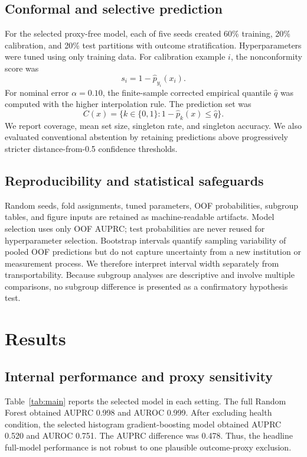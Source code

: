 \documentclass[conference]{IEEEtran}
\begin{document}
\subsection{Conformal and selective prediction}
For the selected proxy-free model, each of five seeds created 60\% training, 20\% calibration, and 20\% test partitions with outcome stratification. Hyperparameters were tuned using only training data. For calibration example $i$, the nonconformity score was
\begin{equation}
s_i = 1 - \hat{p}_{y_i}(x_i).
\end{equation}
For nominal error $\alpha=0.10$, the finite-sample corrected empirical quantile $\hat{q}$ was computed with the higher interpolation rule. The prediction set was
\begin{equation}
C(x)=\{k \in \{0,1\}: 1-\hat{p}_k(x) \leq \hat{q}\}.
\end{equation}
We report coverage, mean set size, singleton rate, and singleton accuracy. We also evaluated conventional abstention by retaining predictions above progressively stricter distance-from-0.5 confidence thresholds.

\subsection{Reproducibility and statistical safeguards}
Random seeds, fold assignments, tuned parameters, OOF probabilities, subgroup tables, and figure inputs are retained as machine-readable artifacts. Model selection uses only OOF AUPRC; test probabilities are never reused for hyperparameter selection. Bootstrap intervals quantify sampling variability of pooled OOF predictions but do not capture uncertainty from a new institution or measurement process. We therefore interpret interval width separately from transportability. Because subgroup analyses are descriptive and involve multiple comparisons, no subgroup difference is presented as a confirmatory hypothesis test.

\section{Results}
\subsection{Internal performance and proxy sensitivity}
Table~\ref{tab:main} reports the selected model in each setting. The full Random Forest obtained AUPRC 0.998 and AUROC 0.999. After excluding health condition, the selected histogram gradient-boosting model obtained AUPRC 0.520 and AUROC 0.751. The AUPRC difference was 0.478. Thus, the headline full-model performance is not robust to one plausible outcome-proxy exclusion.
\end{document}
